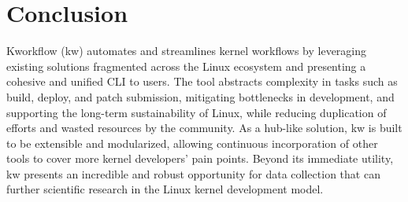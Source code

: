 \section{Conclusion}

Kworkflow (kw) automates and streamlines kernel workflows by leveraging existing
solutions fragmented across the Linux ecosystem and presenting a cohesive and
unified CLI to users. The tool abstracts complexity in tasks such as build,
deploy, and patch submission, mitigating bottlenecks in development, and
supporting the long-term sustainability of Linux, while reducing duplication of
efforts and wasted resources by the community. As a hub-like solution, kw is
built to be extensible and modularized, allowing continuous incorporation of
other tools to cover more kernel developers' pain points. Beyond its immediate
utility, kw presents an incredible and robust opportunity for data collection
that can further scientific research in the Linux kernel development model.
